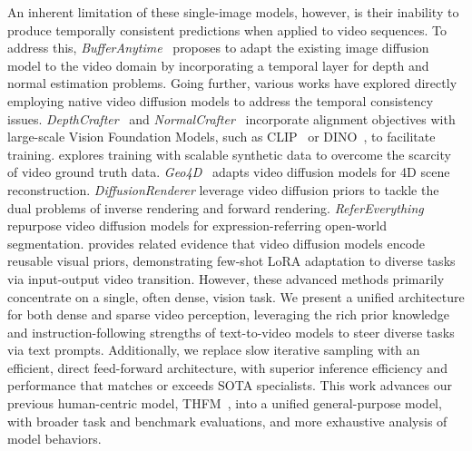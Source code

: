 \documentclass[11pt, a4paper, logo, onecolumn]{googledeepmind}
\begin{document}
An inherent limitation of these single-image models, however, is their inability to produce temporally consistent predictions when applied to video sequences. 
To address this, \textit{BufferAnytime}~\cite{kuang2024bufferanytimezeroshotvideo} proposes to adapt the existing image diffusion model to the video domain by incorporating a temporal layer for depth and normal estimation problems. 
Going further, various works have explored directly employing native video diffusion models to address the temporal consistency issues. \textit{DepthCrafter}~\cite{hu2024depthcraftergeneratingconsistentlong} and \textit{NormalCrafter}~\cite{bin2025normalcrafter} incorporate alignment objectives with large-scale Vision Foundation Models, such as CLIP~\cite{radford2021learning} or DINO~\cite{oquab2023dinov2}, to facilitate training. 
\cite{yang2025depthvideoscalablesynthetic} explores training with scalable synthetic data to overcome the scarcity of video ground truth data. 
\textit{Geo4D}~\cite{jiang2025geo4d} adapts video diffusion models for 4D scene reconstruction.
\textit{DiffusionRenderer} \cite{liang2025diffusionrendererneuralinverseforward} leverage video diffusion priors to tackle the dual problems of inverse rendering and forward rendering. 
\textit{ReferEverything}~\cite{bagchi2025refereverything} repurpose video diffusion models for expression-referring open-world segmentation.
\cite{acuaviva2025generation} provides related evidence that video diffusion models encode reusable visual priors, demonstrating few-shot LoRA adaptation to diverse tasks via input-output video transition.
However, these advanced methods primarily concentrate on a single, often dense, vision task.
We present a unified architecture for both dense and sparse video perception, leveraging the rich prior knowledge and instruction-following strengths of text-to-video models to steer diverse tasks via text prompts. 
Additionally, we replace slow iterative sampling with an efficient, direct feed-forward architecture, with superior inference efficiency and performance that matches or exceeds SOTA specialists. 
This work advances our previous human-centric model, THFM~\cite{wang2026thfm}, into a unified general-purpose model, with broader task and benchmark evaluations, and more exhaustive analysis of model behaviors.
\end{document}
